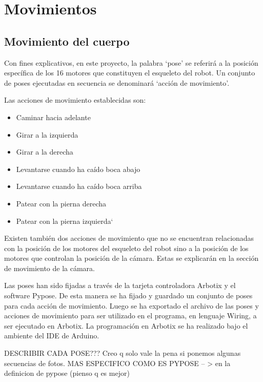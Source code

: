 \chapter{Movimientos}\label{chapter:dise_solver_compilador}

\section{Movimiento del cuerpo}

Con fines explicativos, en este proyecto, la palabra ‘pose’ se referirá a la posición específica de los 16 motores que constituyen el esqueleto del robot. Un conjunto de poses ejecutadas en secuencia se denominará ‘acción de movimiento’.



Las acciones de movimiento establecidas son:


\begin{itemize}
 \item {Caminar hacia adelante}
 \item {Girar a la izquierda}
 \item {Girar a la derecha}
 \item {Levantarse cuando ha caído boca abajo}
 \item {Levantarse cuando ha caído boca arriba}
 \item {Patear con la pierna derecha }
 \item {Patear con la pierna izquierda`}
 
\end{itemize}

Existen también dos acciones de movimiento que no se encuentran relacionadas con la posición de los motores del esqueleto del robot sino a la posición de los motores que controlan la posición de la cámara. Estas se explicarán en la sección de movimiento de la cámara.

Las poses han sido fijadas a través de la tarjeta controladora Arbotix y el software Pypose. De esta manera se ha fijado y guardado un conjunto de poses para cada acción de movimiento. Luego se ha exportado el archivo de las poses y acciones de movimiento para ser utilizado en el programa, en lenguaje Wiring, a ser ejecutado en Arbotix. La programación en Arbotix se ha realizado bajo el ambiente del IDE de Arduino. 

DESCRIBIR CADA POSE???  Creo q solo vale la pena si ponemos algunas secuencias de fotos. 
MAS ESPECIFICO COMO ES PYPOSE -- > en la definicion de pypose (pienso q es mejor)


